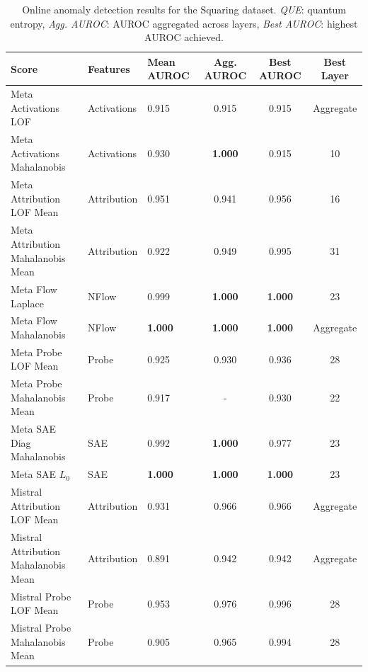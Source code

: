 \begin{table}[H]
\centering
\scriptsize  %
\renewcommand{\arraystretch}{1.2}  %
\setlength{\tabcolsep}{2pt}  %
\begin{tabular}{lp{3cm}lccc}
\toprule
\textbf{Score} & \textbf{Features} & \textbf{Mean AUROC} & \textbf{Agg. AUROC} & \textbf{Best AUROC} & \textbf{Best Layer} \\
\midrule
Meta Activations LOF                 & Activations & 0.915  & 0.915  & 0.915  & Aggregate \\ 
Meta Activations Mahalanobis         & Activations & 0.930  & \textbf{1.000}  & 0.915  & 10 \\ 
Meta Attribution LOF Mean            & Attribution & 0.951  & 0.941  & 0.956  & 16 \\ 
Meta Attribution Mahalanobis Mean    & Attribution & 0.922  & 0.949  & 0.995  & 31 \\ 
Meta Flow Laplace                    & NFlow      & 0.999  & \textbf{1.000}  & \textbf{1.000}  & 23 \\ 
Meta Flow Mahalanobis                & NFlow      & \textbf{1.000}  & \textbf{1.000}  & \textbf{1.000}  & Aggregate \\ 
Meta Probe LOF Mean                  & Probe      & 0.925  & 0.930  & 0.936  & 28 \\ 
Meta Probe Mahalanobis Mean          & Probe      & 0.917  & -      & 0.930  & 22 \\ 
Meta SAE Diag Mahalanobis            & SAE        & 0.992  & \textbf{1.000}  & 0.977  & 23 \\ 
Meta SAE $L_0$                          & SAE        & \textbf{1.000}  & \textbf{1.000}  & \textbf{1.000}  & 23 \\ 
Mistral Attribution LOF Mean         & Attribution & 0.931  & 0.966  & 0.966  & Aggregate \\ 
Mistral Attribution Mahalanobis Mean & Attribution & 0.891  & 0.942  & 0.942  & Aggregate \\ 
Mistral Probe LOF Mean               & Probe      & 0.953  & 0.976  & 0.996  & 28 \\ 
Mistral Probe Mahalanobis Mean       & Probe      & 0.905  & 0.965  & 0.994  & 28 \\ 
\bottomrule
\end{tabular}
\caption{ Online anomaly detection results for the Squaring dataset. \emph{QUE}: quantum entropy, \emph{Agg. AUROC}: AUROC aggregated across layers, \emph{Best AUROC}: highest AUROC achieved.}
\label{tab:online_anomaly_squaring}
\end{table}


